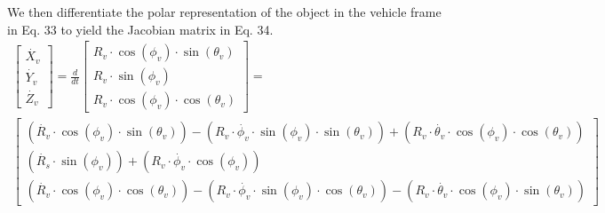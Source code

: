 \documentclass[15pt]{article}
\begin{document}
We then differentiate the polar representation of the object in the vehicle frame in Eq. 33 to yield the Jacobian matrix in Eq. 34. 
\begin{gather}
\left[\begin{array}{c}
\dot{X_{v}}\\
\dot{Y_{v}}\\
\dot{Z_{v}}
\end{array}\right]=\frac{d}{dt}\left[\begin{array}{c}
R_{v}\cdot\cos\left(\phi_{v}\right)\cdot\sin\left(\theta_{v}\right)\\
R_{v}\cdot\sin\left(\phi_{v}\right)\\
R_{v}\cdot\cos\left(\phi_{v}\right)\cdot\cos\left(\theta_{v}\right)
\end{array}\right]= \nonumber\\
\left[\begin{array}{c}
\left(\dot{R_{v}}\cdot\cos\left(\phi_{v}\right)\cdot\sin\left(\theta_{v}\right)\right)-\left(R_{v}\cdot\dot{\phi_{v}}\cdot\sin\left(\phi_{v}\right)\cdot\sin\left(\theta_{v}\right)\right)+\left(R_{v}\cdot\dot{\theta_{v}}\cdot\cos\left(\phi_{v}\right)\cdot\cos\left(\theta_{v}\right)\right)\\
\left(\dot{R_{s}}\cdot\sin\left(\phi_{v}\right)\right)+\left(R_{v}\cdot\dot{\phi_{v}}\cdot\cos\left(\phi_{v}\right)\right)\\
\left(\dot{R_{v}}\cdot\cos\left(\phi_{v}\right)\cdot\cos\left(\theta_{v}\right)\right)-\left(R_{v}\cdot\dot{\phi_{v}}\cdot\sin\left(\phi_{v}\right)\cdot\cos\left(\theta_{v}\right)\right)-\left(R_{v}\cdot\dot{\theta_{v}}\cdot\cos\left(\phi_{v}\right)\cdot\sin\left(\theta_{v}\right)\right)
\end{array}\right]
\end{gather}
\end{document}
